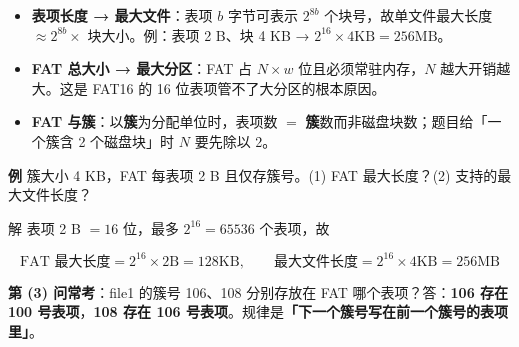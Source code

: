 \documentclass[10pt,a4paper]{ctexart}
\begin{document}


\begin{itemize}

\item \textbf{表项长度 → 最大文件}：表项 $b$ 字节可表示 $2^{8b}$ 个块号，故单文件最大长度 $\approx 2^{8b}\times$ 块大小。例：表项 2 B、块 4 KB → $2^{16}\times4\mathrm{KB}=256\mathrm{MB}$。

\item \textbf{FAT 总大小 → 最大分区}：FAT 占 $N\times w$ 位且必须常驻内存，$N$ 越大开销越大。这是 FAT16 的 16 位表项管不了大分区的根本原因。

\item \textbf{FAT 与簇}：以\textbf{簇}为分配单位时，表项数 $=$ \textbf{簇}数而非磁盘块数；题目给「一个簇含 2 个磁盘块」时 $N$ 要先除以 2。

\end{itemize}


\textbf{例} 簇大小 4 KB，FAT 每表项 2 B 且仅存簇号。(1) FAT 最大长度？(2) 支持的最大文件长度？

解 表项 2 B $=16$ 位，最多 $2^{16}=65536$ 个表项，故

\[
\text{FAT 最大长度}=2^{16}\times2\mathrm{B}=128\mathrm{KB},\qquad \text{最大文件长度}=2^{16}\times4\mathrm{KB}=256\mathrm{MB}
\]

\textbf{第 (3) 问常考}：file1 的簇号 106、108 分别存放在 FAT 哪个表项？答：\textbf{106 存在 100 号表项}，\textbf{108 存在 106 号表项}。规律是\textbf{「下一个簇号写在前一个簇号的表项里」}。






\end{document}
